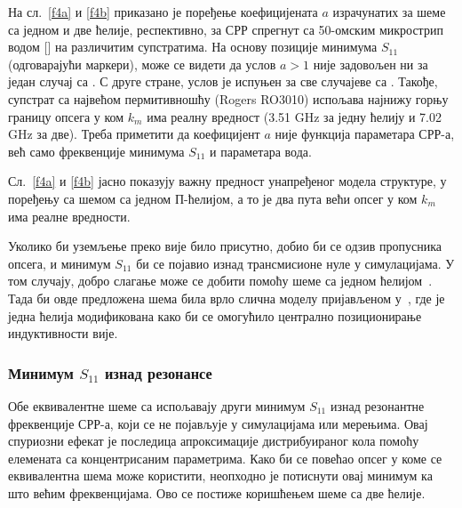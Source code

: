 На сл.~\ref{f4a} и \ref{f4b} приказано је поређење коефицијената $a$ израчунатих за шеме са једном и две ћелије, респективно, за СРР спрегнут са 50-омским микрострип водом [] на различитим супстратима. На основу позиције минимума $S_{11}$ (одговарајући маркери), може се видети да услов $a>1$ није задовољен ни за један случај са . С друге стране, услов је испуњен за све случајеве са . Такође, супстрат са највећом пермитивношћу (Rogers RO3010) испољава најнижу горњу границу опсега у ком $k_m$ има реалну вредност (3.51 GHz за једну ћелију и 7.02 GHz за две). Треба приметити да коефицијент $a$ није функција параметара СРР-а, већ само фреквенције минимума $S_{11}$ и параметара вода.

Сл.~\ref{f4a} и \ref{f4b} јасно показују важну предност унапређеног модела структуре, у поређењу са шемом са једном П-ћелијом, а то је два пута већи опсег у ком $k_m$ има реалне вредности.

Уколико би уземљење преко вије било присутно, добио би се одзив пропусника опсега, и минимум $S_{11}$ би се појавио изнад трансмисионе нуле у симулацијама. У том случају, добро слагање може се добити помоћу шеме са једном ћелијом~\cite{bib16}. Тада би овде предложена шема била врло слична моделу пријављеном у~\cite{aznar_improved}, где је једна ћелија модификована како би се омогућило централно позиционирање индуктивности вије.

\subsubsection{Минимум $S_{11}$ изнад резонансе}

Обе еквивалентне шеме са  испољавају други минимум $S_{11}$ изнад резонантне фреквенције СРР-а, који се не појављује у симулацијама или мерењима. Овај спуриозни ефекат је последица апроксимације дистрибуираног кола помоћу елемената са концентрисаним параметрима. Како би се повећао опсег у коме се еквивалентна шема може користити, неопходно је потиснути овај минимум ка што већим фреквенцијама. Ово се постиже коришћењем шеме са две ћелије.


